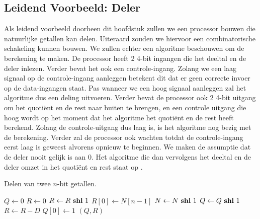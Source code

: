\subsection{Leidend Voorbeeld: Deler}
Als leidend voorbeeld doorheen dit hoofdstuk zullen we een processor bouwen die natuurlijke getallen kan delen. Uiteraard zouden we hiervoor een combinatorische schakeling kunnen bouwen. We zullen echter een algoritme beschouwen om de berekening te maken. De processor heeft 2 4-bit ingangen die het deeltal en de deler inlezen. Verder bevat het ook een controle-ingang. Zolang we een laag signaal op de controle-ingang aanleggen betekent dit dat er geen correcte invoer op de data-ingangen staat. Pas wanneer we een hoog signaal aanleggen zal het algoritme dus een deling uitvoeren. Verder bevat de processor ook 2 4-bit uitgang om het quoti\"ent en de rest naar buiten te brengen, en een controle uitgang die hoog wordt op het moment dat het algoritme het quoti\"ent en de rest heeft berekend. Zolang de controle-uitgang dus laag is, is het algoritme nog bezig met de berekening. Verder zal de processor ook wachten totdat de controle-ingang eerst laag is geweest alvorens opnieuw te beginnen. We maken de assumptie dat de deler nooit gelijk is aan 0. Het algoritme die dan vervolgens het deeltal en de deler omzet in het quoti\"ent en rest staat op .
\begin{algorithm}[hbt]
\caption{Delen van twee $n$-bit getallen.}\label{alg:devisionFSMD}
\begin{algorithmic}[1]
\State $Q\gets 0$
\State $R\gets 0$
\State $R\gets R\mbox{ \textbf{shl} }{}1$
\State $R\left[0\right]\gets N\left[n-1\right]$
\State $N\gets N\mbox{ \textbf{shl} }{}1$
\State $Q\gets Q\mbox{ \textbf{shl} }{}1$
\State $R\gets R-D$
\State $Q\left[0\right]\gets 1$
\EndIf
\EndFor
\State \Return $\left(Q,R\right)$
\EndFunction
\end{algorithmic}
\end{algorithm}
